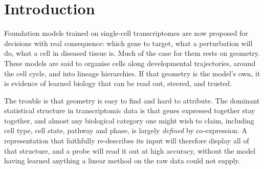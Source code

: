 \documentclass[11pt]{article}
\begin{document}
\begin{abstract}
\textbf{What shapes it.} On synthetic corpora with planted ground truth, a model allocates
representational distance \emph{where its own output distribution turns over fastest}
($+0.160$ over control, $p=0.0041$, 8/8 seeds, localised to the manipulated arc in 5/5). Density does
not predict where the distance goes, and difficulty predicts it with the sign reversed. This
law predicts the one real-data geometry that is demonstrably the model's own: C2S gives extra
representational room to the G1$\to$S restriction point, the commitment step of the cell cycle.
Navigability is fixed separately,
by topology: since $\oint \mathbf{w}\cdot d\mathbf{x}=0$, a constant steering direction must stall a
quarter-turn into any closed manifold, which we verify analytically, synthetically, and in seven
representations.

Running through all three is a methodological point we make explicit and supply tests for: a manifold
visible inside a model is usually a re-parametrisation of one already present in its input, and telling
the two apart requires a competitor built from the same cells rather than a permutation null.
\end{abstract}

\section{Introduction}

Foundation models trained on single-cell transcriptomes
\citep{cui2024scgpt,theodoris2023geneformer,rosen2026uce,levine2024cell2sentence} are now proposed
for decisions with real consequence: which gene to target, what a perturbation will do, what a cell in
diseased tissue is. Much of the case for them rests on geometry. These models are said to organise
cells along developmental trajectories, around the cell cycle, and into lineage hierarchies. If that
geometry is the model's own, it is evidence of learned biology that can be read out, steered, and
trusted.

The trouble is that geometry is easy to find and hard to attribute. The dominant statistical structure
in transcriptomic data is that genes expressed together stay together, and almost any biological
category one might wish to claim, including cell type, cell state, pathway and phase, is largely
\emph{defined} by co-expression. A representation that faithfully re-describes its input will
therefore display all of that structure, and a probe will read it out at high accuracy, without the
model having learned anything a linear method on the raw data could not supply.
\end{document}
